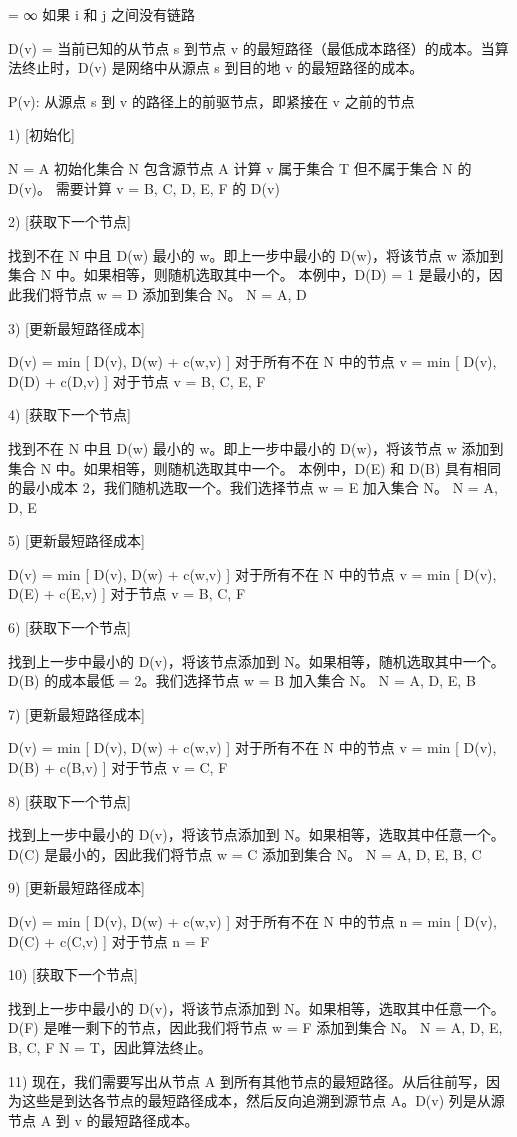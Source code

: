 \documentclass[12pt,a4paper,oneside,UTF8]{ctexart}
\begin{document}
= ∞ 如果 i 和 j 之间没有链路

D(v) = 当前已知的从节点 s 到节点 v 的最短路径（最低成本路径）的成本。当算法终止时，D(v) 是网络中从源点 s 到目的地 v 的最短路径的成本。

P(v): 从源点 s 到 v 的路径上的前驱节点，即紧接在 v 之前的节点

1) [初始化]

N = {A} 初始化集合 N 包含源节点 A
计算 v 属于集合 T 但不属于集合 N 的 D(v)。
需要计算 v = B, C, D, E, F 的 D(v)

2) [获取下一个节点]

找到不在 N 中且 D(w) 最小的 w。即上一步中最小的 D(w)，将该节点 w 添加到集合 N 中。如果相等，则随机选取其中一个。
本例中，D(D) = 1 是最小的，因此我们将节点 w = D 添加到集合 N。
N = { A, D }

3) [更新最短路径成本]

D(v) = min [ D(v), D(w) + c(w,v) ] 对于所有不在 N 中的节点 v
= min [ D(v), D(D) + c(D,v) ] 对于节点 v = B, C, E, F

4) [获取下一个节点]

找到不在 N 中且 D(w) 最小的 w。即上一步中最小的 D(w)，将该节点 w 添加到集合 N 中。如果相等，则随机选取其中一个。
本例中，D(E) 和 D(B) 具有相同的最小成本 2，我们随机选取一个。我们选择节点 w = E 加入集合 N。
N = { A, D, E }

5) [更新最短路径成本]

D(v) = min [ D(v), D(w) + c(w,v) ] 对于所有不在 N 中的节点 v
= min [ D(v), D(E) + c(E,v) ] 对于节点 v = B, C, F

6) [获取下一个节点]

找到上一步中最小的 D(v)，将该节点添加到 N。如果相等，随机选取其中一个。
D(B) 的成本最低 = 2。我们选择节点 w = B 加入集合 N。
N = { A, D, E, B }

7) [更新最短路径成本]

D(v) = min [ D(v), D(w) + c(w,v) ] 对于所有不在 N 中的节点 v
= min [ D(v), D(B) + c(B,v) ] 对于节点 v = C, F

8) [获取下一个节点]

找到上一步中最小的 D(v)，将该节点添加到 N。如果相等，选取其中任意一个。
D(C) 是最小的，因此我们将节点 w = C 添加到集合 N。
N = { A, D, E, B, C}

9) [更新最短路径成本]

D(v) = min [ D(v), D(w) + c(w,v) ] 对于所有不在 N 中的节点 n
= min [ D(v), D(C) + c(C,v) ] 对于节点 n = F

10) [获取下一个节点]

找到上一步中最小的 D(v)，将该节点添加到 N。如果相等，选取其中任意一个。
D(F) 是唯一剩下的节点，因此我们将节点 w = F 添加到集合 N。
N = { A, D, E, B, C, F }
N = T，因此算法终止。

11) 现在，我们需要写出从节点 A 到所有其他节点的最短路径。从后往前写，因为这些是到达各节点的最短路径成本，然后反向追溯到源节点 A。D(v) 列是从源节点 A 到 v 的最短路径成本。
\end{document}
